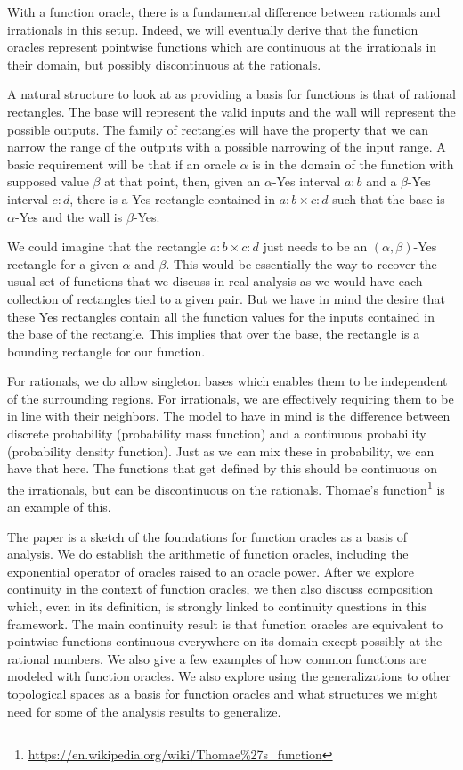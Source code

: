 \documentclass[12pt]{article}
\begin{document}
With a function oracle, there is a fundamental difference between rationals and irrationals in this setup. Indeed, we will eventually derive that the function oracles represent pointwise functions which are continuous at the irrationals in their domain, but possibly discontinuous at the rationals.

A natural structure to look at as providing a basis for functions is that of rational rectangles. The base will represent the valid inputs and the wall will represent the possible outputs. The family of rectangles will have the property that we can narrow the range of the outputs with a possible narrowing of the input range. A basic requirement will be that if an oracle $\alpha$ is in the domain of the function with supposed value $\beta$ at that point, then, given an $\alpha$-Yes interval $a:b$ and a $\beta$-Yes interval $c:d$, there is a Yes rectangle contained in $a:b \times c:d$ such that the base is $\alpha$-Yes and the wall is $\beta$-Yes. 

We could imagine that the rectangle $a:b \times c:d$ just needs to be an $(\alpha, \beta)$-Yes rectangle for a given $\alpha$ and $\beta$. This would be essentially the way to recover the usual set of functions that we discuss in real analysis as we would have each collection of rectangles tied to a given pair. But we have in mind the desire that these Yes rectangles contain all the function values for the inputs contained in the base of the rectangle. This implies that over the base, the rectangle is a bounding rectangle for our function. 

For rationals, we do allow singleton bases which enables them to be independent of the surrounding regions. For irrationals, we are effectively requiring them to be in line with their neighbors. The model to have in mind is the difference between discrete probability (probability mass function) and a continuous probability (probability density function). Just as we can mix these in probability, we can have that here. The functions that get defined by this should be continuous on the irrationals, but can be discontinuous on the rationals. Thomae's function\footnote{\url{https://en.wikipedia.org/wiki/Thomae\%27s_function}} is an example of this. 

The paper is a sketch of the foundations for function oracles as a basis of analysis. We do establish the arithmetic of function oracles, including the exponential operator of oracles raised to an oracle power. After we explore continuity in the context of function oracles, we then also discuss composition which, even in its definition, is strongly linked to continuity questions in this framework. The main continuity result is that function oracles are equivalent to pointwise functions continuous everywhere on its domain except possibly at the rational numbers. We also give a few examples of how common functions are modeled with function oracles. We also explore using the generalizations to other topological spaces as a basis for function oracles and what structures we might need for some of the analysis results to generalize.
\end{document}
